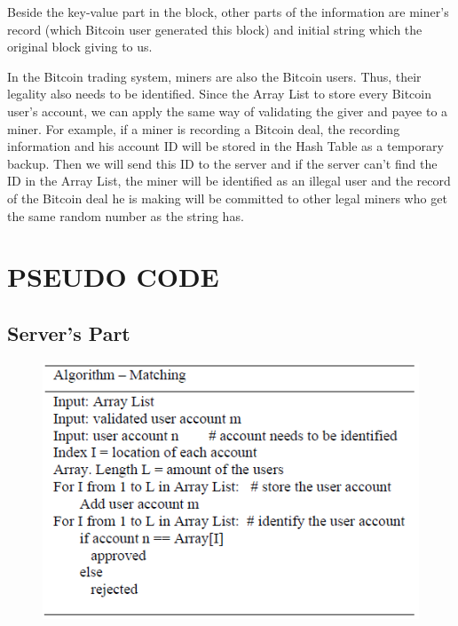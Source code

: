 \documentclass[conference]{IEEEtran}
\begin{document}
Beside the key-value part in the block, other parts of the information are miner’s record (which Bitcoin user generated this block) and initial string which the original block giving to us.

In the Bitcoin trading system, miners are also the Bitcoin users. Thus, their legality also needs to be identified. Since the Array List to store every Bitcoin user’s account, we can apply the same way of validating the giver and payee to a miner. For example, if a miner is recording a Bitcoin deal, the recording information and his account ID will be stored in the Hash Table as a temporary backup. Then we will send this ID to the server and if the server can’t find the ID in the Array List, the miner will be identified as an illegal user and the record of the Bitcoin deal he is making will be committed to other legal miners who get the same random number as the string has.

\section{PSEUDO CODE}
\subsection{Server’s Part}
\begin{figure}[ht]	
	\centering
	\includegraphics[scale=0.4]{ALG_M.png}
\end{figure}
\end{document}
